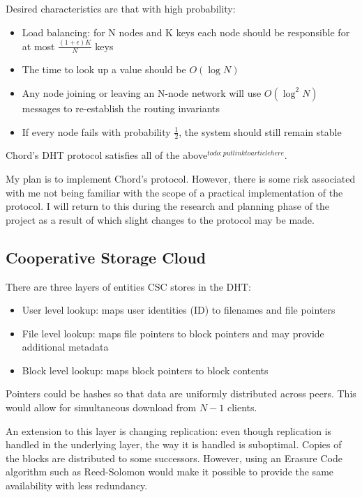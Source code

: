 \documentclass[12pt]{article}
\begin{document}
Desired characteristics are that with high probability:
\begin{itemize}
\item{Load balancing: for N nodes and K keys each node should be responsible for at most $\frac{(1+\epsilon)K}{N}$ keys}
\item{The time to look up a value should be $O(\log N)$}
\item{Any node joining or leaving an N-node network will use $O(\log^2 N)$ messages to re-establish the routing invariants}
\item{If every node fails with probability $\frac{1}{2}$, the system should still remain stable}
\end{itemize}

Chord's DHT protocol satisfies all of the above$^{todo: put link to article here}$.

My plan is to implement Chord's protocol. However, there is some risk associated with me not being familiar with the scope of a practical implementation of the protocol. I will return to this during the research and planning phase of the project as a result of which slight changes to the protocol may be made.

\subsection{Cooperative Storage Cloud}

There are three layers of entities CSC stores in the DHT:
\begin{itemize}
\item{User level lookup: maps user identities (ID) to filenames and file pointers}
\item{File level lookup: maps file pointers to block pointers and may provide additional metadata}
\item{Block level lookup: maps block pointers to block contents}
\end{itemize}

Pointers could be hashes so that data are uniformly distributed across peers. This would allow for simultaneous download from $N-1$ clients.

An extension to this layer is changing replication: even though replication is handled in the underlying layer, the way it is handled is suboptimal. Copies of the blocks are distributed to some successors. However, using an Erasure Code algorithm such as Reed-Solomon would make it possible to provide the same availability with less redundancy.
\end{document}
